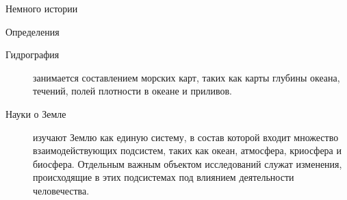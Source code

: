 \begin{chapter}{Немного истории}
\begin{section}{Определения}
\begin{description}
\item[Гидрография] занимается составлением морских карт, таких как
карты глубины океана, течений, полей плотности в океане и приливов.
%

\item[Науки о Земле] изучают Землю как единую систему, в состав 
которой входит множество взаимодействующих подсистем, таких как океан, 
атмосфера, криосфера и биосфера.%
Отдельным важным объектом исследований
служат изменения, происходящие в этих подсистемах под влиянием деятельности
человечества.
%
\end{description}
\end{section}


\end{chapter}
